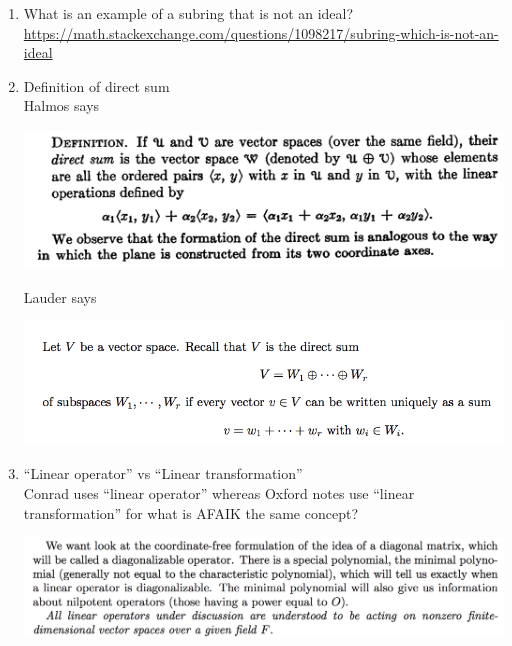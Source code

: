 \documentclass[12pt]{article}
\begin{document}
\begin{enumerate}
{    transformation; it's basis-independent. Algebraically,
    $f(P^\1AP) = \sum_i a_i(P^\1AP)^i = \sum_i a_iP^\1A^iP = P^\1\Big(\sum_ia_iA^i\Big)P =
    P^\1f(A)P$.}
\item What is an example of a subring that is not an ideal?\\
  \url{https://math.stackexchange.com/questions/1098217/subring-which-is-not-an-ideal}
\item Definition of direct sum\\
  Halmos says
  \begin{mdframed}
    \includegraphics[width=400pt]{img/questions-linear-algebra-a0-direct-sum-halmos.png}
  \end{mdframed}
  Lauder says
  \begin{mdframed}
    \includegraphics[width=400pt]{img/questions-linear-algebra-a0-direct-sum-lauder.png}
  \end{mdframed}
\item ``Linear operator'' vs ``Linear transformation''\\
  Conrad uses ``linear operator'' whereas Oxford notes use ``linear transformation'' for what is
  AFAIK the same concept?
  \begin{mdframed}
    \includegraphics[width=400pt]{img/questions-linear-algebra-a0-operator-halmos.png}
  \end{mdframed}
\end{enumerate}
\end{document}
